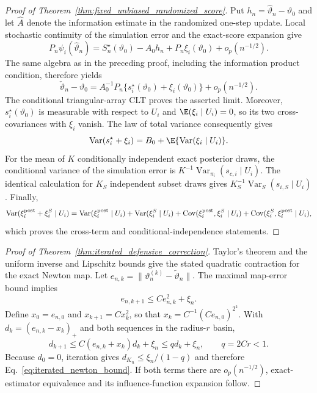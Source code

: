 \begin{proof}[Proof of
Theorem~\ref{thm:fixed_unbiased_randomized_score}]
Put $h_n=\widehat\vartheta_n-\vartheta_0$ and let $\widehat A$ denote the
information estimate in the randomized one-step update.  Local stochastic
continuity of the simulation error and the exact-score expansion give
\[
 P_n\psi_i(\widehat\vartheta_n)
 =S_n^\star(\vartheta_0)-A_0h_n+P_n\xi_i(\vartheta_0)
  +o_p(n^{-1/2}).
\]
The same algebra as in the preceding proof, including the information product
condition, therefore yields
\[
 \check\vartheta_n-\vartheta_0
 =A_0^{-1}P_n\{s_i^\star(\vartheta_0)+\xi_i(\vartheta_0)\}
  +o_p(n^{-1/2}).
\]
The conditional triangular-array CLT proves the asserted limit.  Moreover,
$s_i^\star(\vartheta_0)$ is measurable with respect to $U_i$ and
$\E(\xi_i\mid U_i)=0$, so its two cross-covariances with $\xi_i$ vanish.
The law of total variance consequently gives
\[
 \operatorname{Var}(s_i^\star+\xi_i)
 =B_0+\E\{\operatorname{Var}(\xi_i\mid U_i)\}.
\]
For the mean of $K$ conditionally independent exact posterior draws, the
conditional variance of the simulation error is
$K^{-1}\operatorname{Var}_{\pi_i}(s_{c,i}\mid U_i)$.  The identical calculation
for $K_S$ independent subset draws gives
$K_S^{-1}\operatorname{Var}_{S}(s_{i,S}\mid U_i)$.  Finally,
\[
 \operatorname{Var}(\xi_i^{\rm post}+\xi_i^S\mid U_i)
 =\operatorname{Var}(\xi_i^{\rm post}\mid U_i)
  +\operatorname{Var}(\xi_i^S\mid U_i)
  +\operatorname{Cov}(\xi_i^{\rm post},\xi_i^S\mid U_i)
  +\operatorname{Cov}(\xi_i^S,\xi_i^{\rm post}\mid U_i),
\]
which proves the cross-term and conditional-independence statements.
\end{proof}

\begin{proof}[Proof of Theorem~\ref{thm:iterated_defensive_correction}]
Taylor's theorem and the uniform inverse and Lipschitz bounds give the stated
quadratic contraction for the exact Newton map.  Let
$e_{n,k}=\|\vartheta_n^{(k)}-\widetilde\vartheta_n\|$.  The maximal map-error
bound implies
\[
 e_{n,k+1}\leq Ce_{n,k}^2+\xi_n.
\]
Define $x_0=e_{n,0}$ and $x_{k+1}=Cx_k^2$, so that
$x_k=C^{-1}(Ce_{n,0})^{2^k}$.  With
$d_k=(e_{n,k}-x_k)_+$ and both sequences in the radius-$r$ basin,
\[
 d_{k+1}\leq C(e_{n,k}+x_k)d_k+\xi_n
 \leq qd_k+\xi_n,
 \qquad q=2Cr<1.
\]
Because $d_0=0$, iteration gives
$d_{K_n}\leq\xi_n/(1-q)$ and therefore
Eq.~\eqref{eq:iterated_newton_bound}.  If both terms there are
$o_p(n^{-1/2})$, exact-estimator equivalence and its influence-function
expansion follow.
\end{proof}

